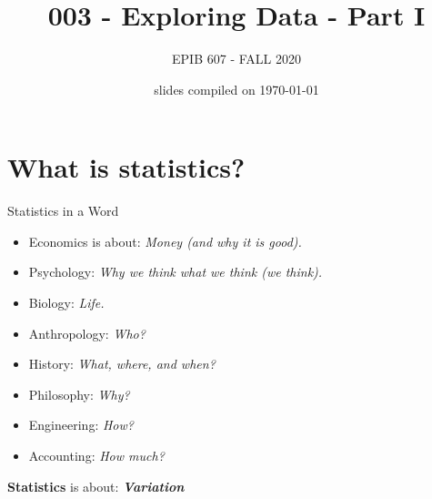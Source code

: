 \documentclass[10pt]{beamer}\usepackage[]{graphicx}\usepackage[]{color}
\begin{document}
	
	
	
	
	\title{003 - Exploring Data - Part I}
	\author{EPIB 607 - FALL 2020}
	
	\date{slides compiled on \today}
	
	\maketitle

\section{What is statistics?}

\begin{frame}{Statistics in a Word}

\begin{itemize}
	\item Economics is about: \textit{Money (and why it is good).}
	\item Psychology: \textit{Why we think what we think (we think).}
	\item Biology: \textit{Life.}
	\item Anthropology: \textit{Who?}
	\item History: \textit{What, where, and when?}
	\item Philosophy: \textit{Why?}
	\item Engineering: \textit{How?}
	\item Accounting: \textit{How much?}
\end{itemize}

\pause 
\vspace*{0.2in}

\textbf{\textcolor{myblue}{Statistics}} is about: \textit{\textbf{Variation}}

\end{frame}
\end{document}
